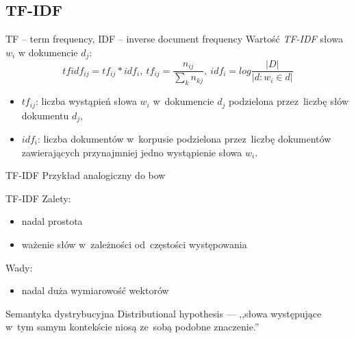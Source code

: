 \documentclass{beamer}
\begin{document}
	\subsection{TF-IDF}
	\begin{frame}{TF – term frequency, IDF – inverse document frequency}
		Wartość \textit{TF-IDF} słowa $w_i$ w dokumencie $d_j$:
		\begin{equation}
		\label{eq:tf-idf}
		tfidf_{ij} = tf_{ij} * idf_i,\ tf_{ij} = \frac{n_{ij}}{\sum\limits_{k}n_{kj}},\ idf_i = log\frac{|D|}{|{d:w_i \in d}|}
		\end{equation}
		\begin{itemize}
			\item $tf_{ij}$: liczba wystąpień słowa $w_i$ w~dokumencie $d_j$ podzielona przez~liczbę słów dokumentu $d_j$,
			\item $idf_i$: liczba dokumentów w~korpusie podzielona przez~liczbę dokumentów zawierających przynajmniej jedno wystąpienie słowa $w_i$.
		\end{itemize}
	\end{frame}
	\begin{frame}{TF-IDF}
		Przykład analogiczny do bow
	\end{frame}
	\begin{frame}{TF-IDF}
		Zalety:
		\begin{itemize}
			\item nadal prostota \pause
			\item ważenie słów w~zależności od~częstości występowania \pause
		\end{itemize}
		Wady:
		\begin{itemize}
			\item nadal duża wymiarowość wektorów
		\end{itemize}
	\end{frame}
	\begin{frame}{Semantyka dystrybucyjna}
		Distributional hypothesis --- ,,słowa występujące w~tym samym kontekście niosą ze~sobą podobne znaczenie.''
	\end{frame}
\end{document}
